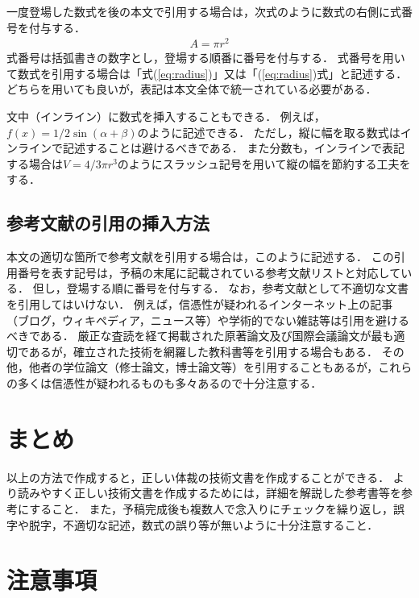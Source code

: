 \documentclass[a4j]{jsarticle}
\begin{document}
一度登場した数式を後の本文で引用する場合は，次式のように数式の右側に式番号を付与する．
\begin{align}
  A = \pi r^2 \label{eq:radius}
\end{align}
式番号は括弧書きの数字とし，登場する順番に番号を付与する．
式番号を用いて数式を引用する場合は「式(\ref{eq:radius})」又は「(\ref{eq:radius})式」と記述する．
どちらを用いても良いが，表記は本文全体で統一されている必要がある．

文中（インライン）に数式を挿入することもできる．
例えば，$f(x) = 1/2 \sin(\alpha + \beta)$のように記述できる．
ただし，縦に幅を取る数式はインラインで記述することは避けるべきである．
また分数も，インラインで表記する場合は$V = 4/3\pi r^3$のようにスラッシュ記号を用いて縦の幅を節約する工夫をする．

\subsection{参考文献の引用の挿入方法}

本文の適切な箇所で参考文献を引用する場合は，このように記述する\cite{sample1}．
この引用番号を表す記号は，予稿の末尾に記載されている参考文献リストと対応している\cite{sample2}．
但し，登場する順に番号を付与する．
なお，参考文献として不適切な文書を引用してはいけない．
例えば，信憑性が疑われるインターネット上の記事（ブログ，ウィキペディア，ニュース等）や学術的でない雑誌等は引用を避けるべきである．
厳正な査読を経て掲載された原著論文及び国際会議論文が最も適切であるが，確立された技術を網羅した教科書等を引用する場合もある．
その他，他者の学位論文（修士論文，博士論文等）を引用することもあるが，これらの多くは信憑性が疑われるものも多々あるので十分注意する．

\section{まとめ}

以上の方法で作成すると，正しい体裁の技術文書を作成することができる．
より読みやすく正しい技術文書を作成するためには，詳細を解説した参考書等を参考にすること．
また，予稿完成後も複数人で念入りにチェックを繰り返し，誤字や脱字，不適切な記述，数式の誤り等が無いように十分注意すること．

\section{注意事項}
\end{document}
